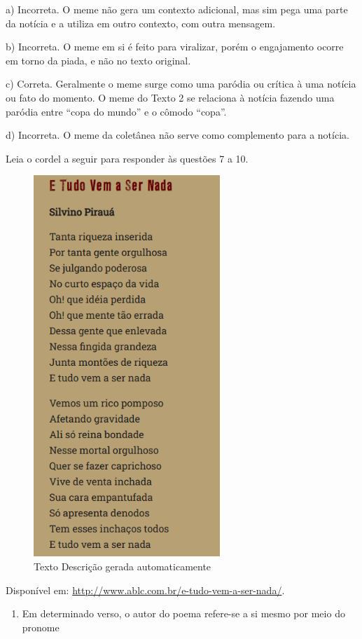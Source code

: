 a) Incorreta. O meme não gera um contexto adicional, mas sim pega uma
parte da notícia e a utiliza em outro contexto, com outra mensagem.

b) Incorreta. O meme em si é feito para viralizar, porém o engajamento
ocorre em torno da piada, e não no texto original.

c) Correta. Geralmente o meme surge como uma paródia ou crítica à uma
notícia ou fato do momento. O meme do Texto 2 se relaciona à notícia
fazendo uma paródia entre ``copa do mundo'' e o cômodo ``copa''.

d) Incorreta. O meme da coletânea não serve como complemento para a
notícia.

Leia o cordel a seguir para responder às questões 7 a 10.

\begin{figure}
\centering
\includegraphics[width=2.77524in,height=5.66716in]{./imgSAEB_6_POR/media/image49.png}
\caption{Texto Descrição gerada automaticamente}
\end{figure}

Disponível em: \url{http://www.ablc.com.br/e-tudo-vem-a-ser-nada/}.

\begin{enumerate}
\def\labelenumi{\arabic{enumi}.}
\setcounter{enumi}{6}
\tightlist
\item
  Em determinado verso, o autor do poema refere-se a si mesmo por meio
  do pronome
\end{enumerate}

